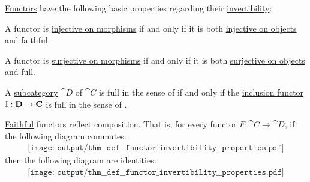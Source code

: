 \begin{proposition}\label{thm:def:functor_invertibility/properties}
  \hyperref[def:functor]{Functors} have the following basic properties regarding their \hyperref[def:functor_invertibility]{invertibility}:

  \begin{thmenum}
     A functor is \hyperref[def:functor_invertibility/injective_on_morphisms]{injective on morphisms} if and only if it is both \hyperref[def:functor_invertibility/injective_on_objects]{injective on objects} and \hyperref[def:functor_invertibility/faithful]{faithful}.

     A functor is \hyperref[def:functor_invertibility/surjective_on_morphisms]{surjective on morphisms} if and only if it is both \hyperref[def:functor_invertibility/surjective_on_objects]{surjective on objects} and \hyperref[def:functor_invertibility/full]{full}.

     A \hyperref[def:subcategory]{subcategory} \( \cat{D} \) of \( \cat{C} \) is full in the sense of  if and only if the \hyperref[def:subcategory]{inclusion functor} \( \operatorname{I}: \operatorname{\mathbf{D}} \to \operatorname{\mathbf{C}} \) is full in the sense of .

     \hyperref[def:functor_invertibility/faithful]{Faithful} functors reflect composition. That is, for every functor \( F: \cat{C} \to \cat{D} \), if the following diagram commutes:
    \begin{equation}\label{eq:thm:def:functor_invertibility/properties/faithful_reflects_composition/image}
      \begin{aligned}
        \texttt{[image: output/thm\_\_def\_\_functor\_invertibility\_\_properties.pdf]}
      \end{aligned}
    \end{equation}
    then the following diagram are identities:
    \begin{equation}\label{eq:thm:def:functor_invertibility/properties/faithful_reflects_composition/source}
      \begin{aligned}
        \texttt{[image: output/thm\_\_def\_\_functor\_invertibility\_\_properties.pdf]}
      \end{aligned}
    \end{equation}


\end{thmenum}
\end{proposition}
